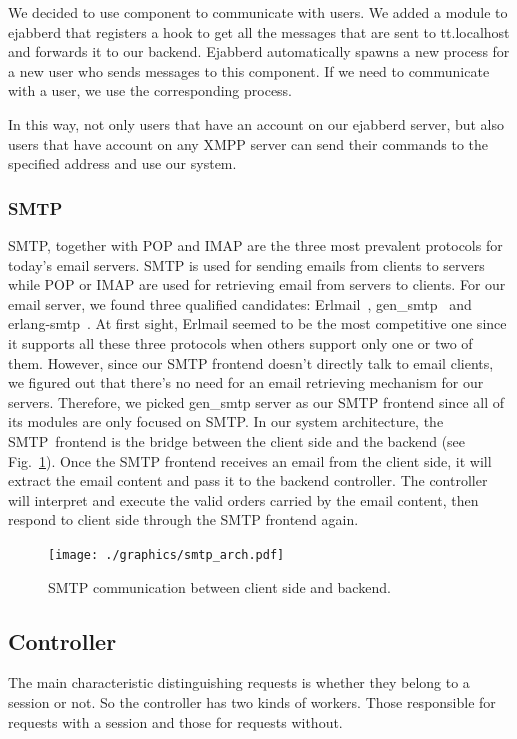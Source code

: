 \documentclass[11pt,a4paper]{report}
\begin{document}
We decided to use component to communicate with users. We added a module to
ejabberd that registers a hook to get all the messages that are sent to
tt.localhost and forwards it to our backend. Ejabberd automatically spawns a
new process for a new user who sends messages to this component.
If we need to communicate with a user, we use the corresponding process.

In this way, not only users that have an account on our ejabberd server, but
also users that have account on any XMPP server can send their commands to the
specified address and use our system.

\subsubsection{SMTP}
SMTP, together with POP and IMAP are the three most prevalent protocols for
today's email servers.
SMTP is used for sending emails from clients to servers while POP or IMAP
are used for retrieving email from servers to clients.
For our email server, we found three qualified candidates: Erlmail~\cite{erlmail},
gen\_smtp~\cite{gen_smtp} and erlang-smtp~\cite{erlang-smtp}.
At first sight, Erlmail seemed to be the most competitive one since it
supports all these three protocols when others support only one or two of them.
However, since our SMTP frontend doesn't directly talk to email clients, we
figured out that there's no need for an email retrieving mechanism for our
servers. Therefore, we picked gen\_smtp server as our SMTP frontend since all
of its modules are only focused on SMTP. In our system architecture, the
SMTP~frontend is the bridge between the client side and the backend
(see Fig.~\ref{fig:smtp_arch}).
Once the SMTP frontend receives an email from the client side, it will extract
the email content and pass it to the backend controller. The controller will
interpret and execute the valid orders carried by the email content, then
respond to client side through the SMTP frontend again.

\begin{figure}[h]
 \centering
 \texttt{[image: ./graphics/smtp\_arch.pdf]}
 \caption{SMTP communication between client side and backend.}
 \label{fig:smtp_arch}
\end{figure}

\subsection{Controller}
The main characteristic distinguishing requests is whether they belong to a
session or not.
So the controller has two kinds of workers.
Those responsible for requests with a session and those for requests without.
\end{document}
